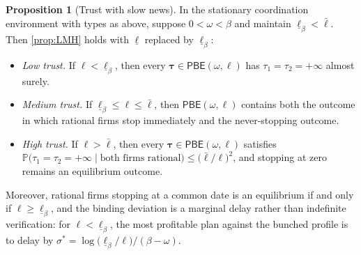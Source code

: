 \documentclass[12pt,reqno]{article}
\renewcommand{\Pr}{\mathbb{P}}
\newcommand{\PBE}{\ensuremath{\mathsf{PBE}}}
\theoremstyle{definition} \newtheorem{example}{Example}
\theoremstyle{definition} \newtheorem{condition}{Condition}
\theoremstyle{definition} \newtheorem{corollary}{Corollary}
\theoremstyle{definition} \newtheorem{claim}{Claim}
\theoremstyle{definition} \newtheorem{definition}{Definition}
\theoremstyle{definition} \newtheorem{conjecture}{Conjecture}
\theoremstyle{definition} \newtheorem{Lemma}{Lemma}
\theoremstyle{definition} \newtheorem{lemma}{Lemma}
\theoremstyle{plain} \newtheorem{theorem}{Theorem}
\theoremstyle{definition} \newtheorem{assumption}{Assumption}
\theoremstyle{definition} \newtheorem*{assumptionnonumber}{Assumption}
\theoremstyle{definition} \newtheorem*{theoremNoNumber}{Proposition}
\theoremstyle{definition}
\theoremstyle{definition}\newtheorem{proposition}{Proposition}
\theoremstyle{definition} \newtheorem{result}{Result}
\theoremstyle{definition} \newtheorem*{definitionNoNumber}{Definition}
\theoremstyle{definition} \newtheorem{Definition}{Definition}
\theoremstyle{definition} \newtheorem*{DefinitionNoNumber}{Definition}
\theoremstyle{definition} \newtheorem*{fact}{Fact}
\theoremstyle{definition} \newtheorem*{property}{Property}
\theoremstyle{definition} \newtheorem{remark}{Remark}
\begin{document}
\begin{proposition}[Trust with slow news]\label{prop:slow-news}
In the stationary coordination environment with types as above, suppose $0<\omega<\beta$ and maintain $\underline\ell_\beta<\bar\ell$. Then \cref{prop:LMH} holds with $\underline\ell$ replaced by $\underline\ell_\beta$:
\begin{itemize}[leftmargin=2.4em]
\item[(i)] \emph{Low trust.} If $\ell<\underline\ell_\beta$, then every $\bm\tau\in\PBE(\omega,\ell)$ has $\tau_1=\tau_2=+\infty$ almost surely.
\item[(ii)] \emph{Medium trust.} If $\underline\ell_\beta\le\ell\le\bar\ell$, then $\PBE(\omega,\ell)$ contains both the outcome in which rational firms stop immediately and the never-stopping outcome.
\item[(iii)] \emph{High trust.} If $\ell>\bar\ell$, then every $\bm\tau\in\PBE(\omega,\ell)$ satisfies
$\Pr\big(\tau_1=\tau_2=+\infty\mid\text{both firms rational}\big)\le\big(\bar\ell/\ell\big)^2$, and stopping at zero remains an equilibrium outcome.
\end{itemize}
Moreover, rational firms stopping at a common date is an equilibrium if and only if $\ell\ge\underline\ell_\beta$, and the binding deviation is a marginal delay rather than indefinite verification: for $\ell<\underline\ell_\beta$, the most profitable plan against the bunched profile is to delay by $\sigma^\ast=\log\big(\underline\ell_\beta/\ell\big)/(\beta-\omega)$.
\end{proposition}
\end{document}

